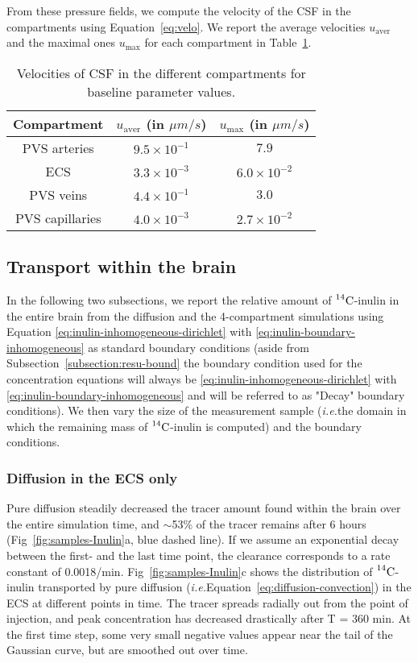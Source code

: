 \documentclass[a4paper,11pt]{article}
\newcommand{\ie}{\emph{i.e.}\;}
\newcommand{\1}{^{(1)}}
\newcommand{\2}{^{(2)}}
\newcommand{\Cinulin}{$\prescript{14}{}{\text{C}}$-inulin }
\begin{document}
From these pressure fields, we compute the velocity of the CSF in the compartments using Equation~\eqref{eq:velo}. We report the average velocities $u_\text{aver}$ and the maximal ones $u_\text{max}$ for each compartment in Table~\ref{tab:velocities-baseline}.

\begin{table}[]
    \centering
    \begin{tabular}{c|c|c}
       Compartment & $u_\text{aver}$ (in $\si{\mu m/s}$) & $u_\text{max}$ (in $\si{\mu m/s}$) \\
       \hline
    
        PVS arteries & $9.5 \times10^{-1}$ & $7.9$ \\
        ECS &  $3.3\times 10^{-3}$ & $6.0 \times 10^{-2}$ \\
        PVS veins & $4.4\times10^{-1}$ & $3.0$ \\
        PVS capillaries & $4.0\times 10^{-3}$ & $2.7\times 10^{-2}$
    \end{tabular}
    \caption{Velocities of CSF in the different compartments for baseline parameter values.}
    \label{tab:velocities-baseline}
\end{table}

\subsection{Transport within the brain}
In the following two subsections, we report the relative amount of \Cinulin in the entire brain from the diffusion and the 4-compartment simulations using Equation \eqref{eq:inulin-inhomogeneous-dirichlet} with \eqref{eq:inulin-boundary-inhomogeneous} as standard boundary conditions (aside from Subsection~\ref{subsection:resu-bound} the boundary condition used for the concentration equations will always be \eqref{eq:inulin-inhomogeneous-dirichlet} with \eqref{eq:inulin-boundary-inhomogeneous} and will be referred to as "Decay" boundary conditions). We then vary the size of the measurement sample (\ie the domain in which the remaining mass of \Cinulin is computed) and the boundary conditions. 

\subsubsection{Diffusion in the ECS only}
Pure diffusion steadily decreased the tracer amount found within the brain over the entire simulation time, and $\sim$53\% of the tracer remains after 6 hours (Fig~\ref{fig:samples-Inulin}a, blue dashed line). If we assume an exponential decay between the first- and the last time point, the clearance corresponds to a rate constant of 0.0018/min. Fig~\ref{fig:samples-Inulin}c shows the distribution of \Cinulin transported by pure diffusion (\ie Equation~\eqref{eq:diffusion-convection}) in the ECS at different points in time. The tracer spreads radially out from the point of injection, and peak concentration has decreased drastically after T = 360 min. At the first time step, some very small negative values appear near the tail of the Gaussian curve, but are smoothed out over time. 
\end{document}
